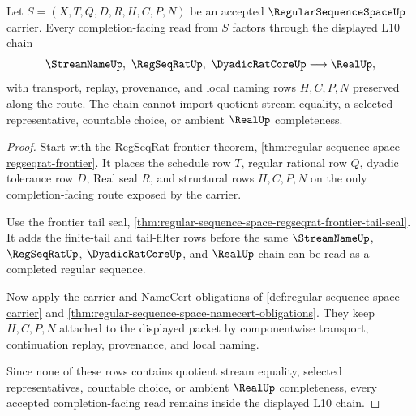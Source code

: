 \begin{theorem}
\label{thm:regular-sequence-space-l10-link}
Let $S=(X,T,Q,D,R,H,C,P,N)$ be an accepted $\RegularSequenceSpaceUp$ carrier. Every completion-facing read from $S$ factors through the displayed L10 chain
$$
\StreamNameUp,\ \RegSeqRatUp,\ \DyadicRatCoreUp \longrightarrow \RealUp,
$$
with transport, replay, provenance, and local naming rows $H,C,P,N$ preserved along the route. The chain cannot import quotient stream equality, a selected representative, countable choice, or ambient $\RealUp$ completeness.
\end{theorem}
\begin{proof}
Start with the RegSeqRat frontier theorem, \autoref{thm:regular-sequence-space-regseqrat-frontier}. It places the schedule row $T$, regular rational row $Q$, dyadic tolerance row $D$, Real seal $R$, and structural rows $H,C,P,N$ on the only completion-facing route exposed by the carrier.

Use the frontier tail seal, \autoref{thm:regular-sequence-space-regseqrat-frontier-tail-seal}. It adds the finite-tail and tail-filter rows before the same $\StreamNameUp$, $\RegSeqRatUp$, $\DyadicRatCoreUp$, and $\RealUp$ chain can be read as a completed regular sequence.

Now apply the carrier and NameCert obligations of \autoref{def:regular-sequence-space-carrier} and \autoref{thm:regular-sequence-space-namecert-obligations}. They keep $H,C,P,N$ attached to the displayed packet by componentwise transport, continuation replay, provenance, and local naming.

Since none of these rows contains quotient stream equality, selected representatives, countable choice, or ambient $\RealUp$ completeness, every accepted completion-facing read remains inside the displayed L10 chain.
\end{proof}
